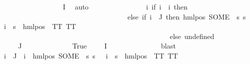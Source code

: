 \begin{isabellebody}
\ \ \ \ \ \ \ \ \ \ \ \ \isamarkupfalse%
\ {\isacartoucheopen}{\isasymphi}\ {\isasymin}\ {\isasymPhi}\ {\isacharbackquote}{\kern0pt}\ I{\isacartoucheclose}\ \isamarkupfalse%
\ auto\isanewline
\ \ \ \ \ \ \ \ \ \ \isamarkupfalse%
\ {\isasymPsi}\ \ {\isachardoublequoteopen}{\isasymPsi}\ {\isasymequiv}\ {\isacharparenleft}{\kern0pt}{\isasymlambda}i{\isachardot}{\kern0pt}\ {\isacharparenleft}{\kern0pt}if\ i\ {\isacharequal}{\kern0pt}\ i{\isacharunderscore}{\kern0pt}{\isasymphi}\ then\ {\isasympsi}\ \isanewline
\ \ \ \ \ \ \ \ \ \ \ \ \ \ \ \ \ \ \ \ \ \ \ \ \ \ \ \ \ \ \ \ \ \ \ \ else\ {\isacharparenleft}{\kern0pt}if\ i\ {\isasymin}\ J\ then\ {\isacharparenleft}{\kern0pt}hml{\isacharunderscore}{\kern0pt}pos\ {\isacharparenleft}{\kern0pt}SOME\ {\isasymalpha}{\isachardot}{\kern0pt}\ {\isacharparenleft}{\kern0pt}{\isasymforall}s{\isachardot}{\kern0pt}\ {\isacharparenleft}{\kern0pt}s\ {\isasymTurnstile}\ {\isasymPhi}\ i{\isacharparenright}{\kern0pt}\ {\isasymlongleftrightarrow}\ {\isacharparenleft}{\kern0pt}s\ {\isasymTurnstile}\ {\isacharparenleft}{\kern0pt}hml{\isacharunderscore}{\kern0pt}pos\ {\isasymalpha}\ TT{\isacharparenright}{\kern0pt}{\isacharparenright}{\kern0pt}{\isacharparenright}{\kern0pt}{\isacharparenright}{\kern0pt}\ TT{\isacharparenright}{\kern0pt}\ \ \isanewline
\ \ \ \ \ \ \ \ \ \ \ \ \ \ \ \ \ \ \ \ \ \ \ \ \ \ \ \ \ \ \ \ \ \ \ \ \ \ \ \ \ \ \ \ \ \ \ \ else\ undefined{\isacharparenright}{\kern0pt}{\isacharparenright}{\kern0pt}{\isacharparenright}{\kern0pt}{\isachardoublequoteclose}\isanewline
\ \ \ \ \ \ \ \ \ \ \isamarkupfalse%
\ {\isachardoublequoteopen}{\isasymphi}\ {\isasymnotin}\ {\isasymPhi}\ {\isacharbackquote}{\kern0pt}\ J{\isachardoublequoteclose}\isanewline
\ \ \ \ \ \ \ \ \ \ \ \ \isamarkupfalse%
\ True\ {\isacartoucheopen}{\isasymphi}\ {\isasymin}\ {\isasymPhi}\ {\isacharbackquote}{\kern0pt}\ I{\isacartoucheclose}\ \isanewline
\ \ \ \ \ \ \ \ \ \ \ \ \isamarkupfalse%
\ blast\isanewline
\ \ \ \ \ \ \ \ \ \ \isamarkupfalse%
\ {\isachardoublequoteopen}{\isasymforall}i\ {\isasymin}\ J{\isachardot}{\kern0pt}\ {\isasymPsi}\ i\ {\isacharequal}{\kern0pt}\ {\isacharparenleft}{\kern0pt}hml{\isacharunderscore}{\kern0pt}pos\ {\isacharparenleft}{\kern0pt}SOME\ {\isasymalpha}{\isachardot}{\kern0pt}\ {\isacharparenleft}{\kern0pt}{\isasymforall}s{\isachardot}{\kern0pt}\ {\isacharparenleft}{\kern0pt}s\ {\isasymTurnstile}\ {\isasymPhi}\ i{\isacharparenright}{\kern0pt}\ {\isasymlongleftrightarrow}\ {\isacharparenleft}{\kern0pt}s\ {\isasymTurnstile}\ {\isacharparenleft}{\kern0pt}hml{\isacharunderscore}{\kern0pt}pos\ {\isasymalpha}\ TT{\isacharparenright}{\kern0pt}{\isacharparenright}{\kern0pt}{\isacharparenright}{\kern0pt}{\isacharparenright}{\kern0pt}\ TT{\isacharparenright}{\kern0pt}{\isachardoublequoteclose}\isanewline

\end{isabellebody}
